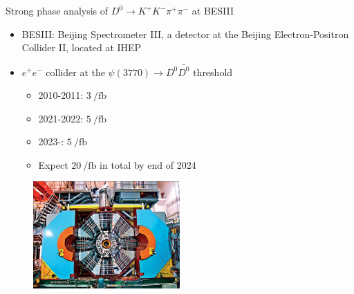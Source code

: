 \documentclass{beamer}
\begin{document}
\begin{frame}{Strong phase analysis of $D^0\to K^+K^-\pi^+\pi^-$ at BESIII}
  \begin{itemize}
    \item{BESIII: Beijing Spectrometer III, a detector at the Beijing Electron-Positron Collider II, located at IHEP}
    \item{$e^+e^-$ collider at the $\psi(3770)\to D^0\bar{D^0}$ threshold}
    \begin{itemize}
      \item{2010-2011: $\SI{3}{\per\femto\barn}$}
      \item{2021-2022: $\SI{5}{\per\femto\barn}$}
      \item{2023-: $\SI{5}{\per\femto\barn}$}
      \item{Expect $\SI{20}{\per\femto\barn}$ in total by end of 2024}
    \end{itemize}
  \end{itemize}
  \begin{figure}
    \includegraphics[width = 0.50\textwidth]{Plots/BESIIIDetector.jpg}
  \end{figure}
\end{frame}
\end{document}
